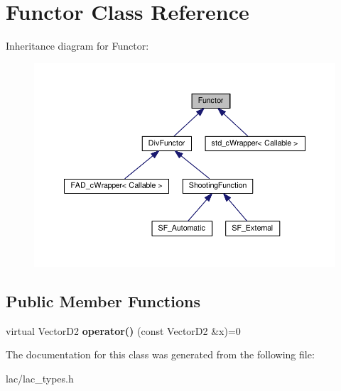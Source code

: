 \hypertarget{classFunctor}{}\section{Functor Class Reference}
\label{classFunctor}


Inheritance diagram for Functor\+:\nopagebreak
\begin{figure}[H]
\begin{center}
\leavevmode
\includegraphics[width=350pt]{classFunctor__inherit__graph}
\end{center}
\end{figure}
\subsection*{Public Member Functions}
\begin{DoxyCompactItemize}
\item 
\mbox{\label{classFunctor_a79e7aeb507e6d8715c1dde8f5c0d598b}} 
virtual Vector\+D2 {\bfseries operator()} (const Vector\+D2 \&x)=0
\end{DoxyCompactItemize}


The documentation for this class was generated from the following file\+:\begin{DoxyCompactItemize}
\item 
lac/lac\+\_\+types.\+h\end{DoxyCompactItemize}
